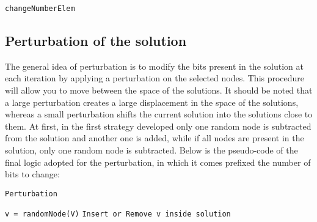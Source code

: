 \documentclass[11pt, oneside]{article}
\begin{document}
\qquad

\begin{algorithm}
    \caption{\texttt{changeNumberElem}}
    \begin{algorithmic}
		\EndIf{}
    \end{algorithmic}
    \end{algorithm}


\qquad

\qquad

\qquad


\subsection{ Perturbation of the solution}

The general idea of perturbation is to modify the bits present in the solution at each iteration by applying a perturbation on the selected nodes. This procedure will allow you to move between the space of the solutions. It should be noted that a large perturbation creates a large displacement in the space of the solutions, whereas a small perturbation shifts the current solution into the solutions close to them. At first, in the first strategy developed only one random node is subtracted from the solution and another one is added, while if all nodes are present in the solution, only one random node is subtracted. Below is the pseudo-code of the final logic adopted for the perturbation, in which it comes prefixed the number of bits to change:
\qquad

\qquad

\begin{algorithm}
    \caption{\texttt{Perturbation}}
    \begin{algorithmic}
       	 \State \texttt{v = randomNode(V)}
	 \State \texttt{Insert or Remove v inside solution}
     	\EndFor{}
    \end{algorithmic}
    \end{algorithm}
\end{document}
